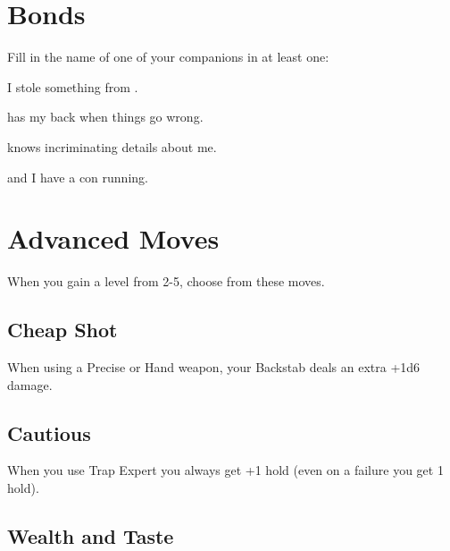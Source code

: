          
\stopitemize
       

       
\section{Bonds}   
       

         

Fill in the name of one of your companions in at least one:

         

I stole something from \thinrules[n=2].

         

\thinrules[n=2] has my back when things go wrong.

         

\thinrules[n=2] knows incriminating details about me.

         

\thinrules[n=2] and I have a con running.

       

       
\section{Advanced Moves}    
       

         
\startInstructionsAfterHeader
When you gain a level from 2-5, choose from these moves.
\stopInstructionsAfterHeader
         
\subsection{Cheap Shot}    
         

When using a Precise or Hand weapon, your Backstab deals an extra +1d6 damage.

         
\subsection{Cautious}   
         

When you use Trap Expert you always get +1 hold (even on a failure you get 1 hold).

         
\subsection{Wealth and Taste}    
         

